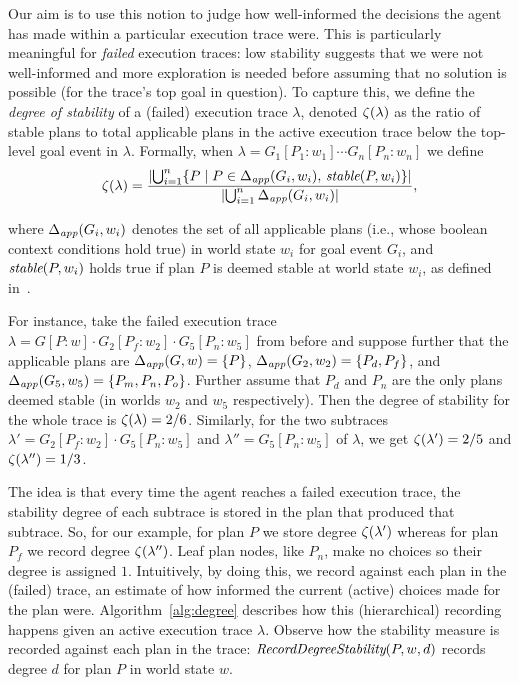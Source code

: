 Our aim is to use this notion to judge how  well-informed the decisions the agent has made within a particular execution trace were. This is particularly meaningful for \emph{failed} execution traces: low stability suggests that we were not well-informed and more exploration is needed before assuming that no solution is possible (for the trace's top goal in question).
To capture this, we define the \emph{degree of stability} of a (failed) execution trace $\lambda$, denoted $\zeta(\lambda)$ as the ratio of stable plans to total applicable plans in the active execution trace below the top-level goal event in $\lambda$. Formally, when $\lambda= G_1[P_1:w_1] \cdots G_n[P_n:w_n]$ we define 
\[
\zeta(\lambda) = 
	\frac{ 
			|{ \bigcup_{i=1}^n \{P \mid P \in \Delta_{\operatorname{\textit{app}}}(G_i,w_i),\, \operatorname{\textit{stable}}(P,w_i)\} }| 
		}
		{
			|{	\bigcup_{i=1}^n \Delta_{\operatorname{\textit{app}}}(G_i,w_i) }| 
		},
\]

\noindent
where  $\Delta_{\operatorname{\textit{app}}}(G_i,w_i)$ denotes the set of all applicable plans (i.e., whose boolean context conditions hold true) in world state $w_i$ for goal event $G_i$, and $\operatorname{\textit{stable}}(P,w_i)$ holds true if plan $P$ is deemed stable at world state $w_i$, as defined in~\cite{singh10:learning}.

For instance, take the failed execution trace $\lambda = G[P:w] \cdot G_2[P_f:w_2] \cdot G_5[P_n:w_5]$ from before and suppose further that the applicable plans are $\Delta_{\operatorname{\textit{app}}}(G,w) = \{P\}$, $\Delta_{\operatorname{\textit{app}}}(G_2,w_2) = \{P_d,P_f\}$, and $\Delta_{\operatorname{\textit{app}}}(G_5,w_5) = \{P_m,P_n,P_o\}$. Further assume that $P_d$ and $P_n$ are the only plans deemed stable (in worlds $w_2$ and $w_5$ respectively). 
Then the degree of stability for the whole trace is $\zeta(\lambda)= 2/6$.
Similarly, for the two subtraces $\lambda'= G_2[P_f:w_2] \cdot G_5[P_n:w_5]$ and $\lambda'' =G_5[P_n:w_5]$ of $\lambda$, we get $\zeta(\lambda') = 2/5$ and $\zeta(\lambda'') = 1/3$.



\newcommand{\StablePlan}{\mathname{StablePlan}}
\newcommand{\SetDegreeStability}{\mathname{RecordDegreeStability}}
\newcommand{\UpdateDegreeStability}{\mathname{RecordDegreeStabilityInTrace}}

The idea is that every time the agent reaches a failed execution trace, the stability degree of each subtrace is stored in the plan that produced that subtrace.
So, for our example, for plan $P$ we store degree $\zeta(\lambda')$ whereas for plan $P_f$ we record degree $\zeta(\lambda'')$. Leaf plan nodes, like $P_n$, make no choices so their degree is assigned $1$.
Intuitively, by doing this, we record against each plan in the (failed) trace, an estimate of how informed the current (active) choices made for the plan were.  
Algorithm~\ref{alg:degree} describes how this (hierarchical) recording happens given an active execution trace $\lambda$. Observe how the stability measure is recorded against each plan in the trace: $\SetDegreeStability(P, w, d)$ records degree $d$ for plan $P$ in world state $w$.

